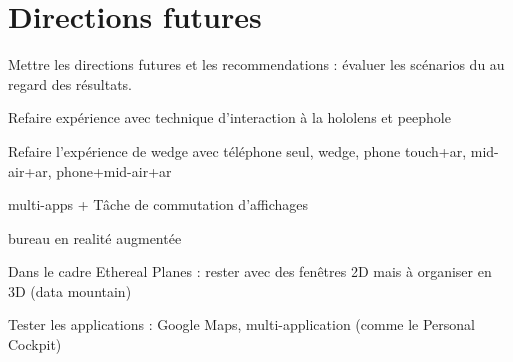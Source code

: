 \chapter{Directions futures}
\label{ch:futur_work}

Mettre les directions futures et les recommendations : évaluer les scénarios du  au regard des résultats.

Refaire expérience avec technique d'interaction à la hololens et peephole

Refaire l'expérience de wedge avec téléphone seul, wedge, phone touch+ar, mid-air+ar, phone+mid-air+ar

multi-apps + Tâche de commutation d'affichages

bureau en realité augmentée

Dans le cadre Ethereal Planes : rester avec des fenêtres 2D mais à organiser en 3D (data mountain)

Tester les applications : Google Maps, multi-application (comme le Personal Cockpit)